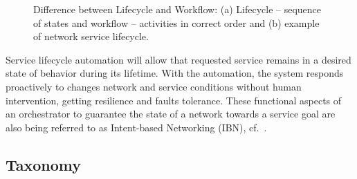 \begin{figure}[thpb]
\centering
 \caption{Difference between Lifecycle and Workflow: (a) Lifecycle -- sequence of states and workflow -- activities in correct order and (b) example of network service lifecycle.}
 \label{fig:lifeworkflow}  
\end{figure}

Service lifecycle automation will allow that requested service remains in a desired state of behavior during its lifetime. With the automation, the system responds proactively to changes network and service conditions without human intervention, getting resilience and faults tolerance. These functional aspects of an orchestrator to guarantee the state of a network towards a service goal are also being referred to as Intent-based Networking (IBN), cf.~\cite{ibn}.

\subsection{Taxonomy}

